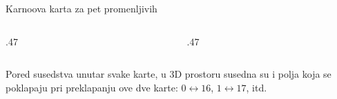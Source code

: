 \begin{frame}[label=02-s037]{Karnoova karta za pet promenljivih}
\setlength{\parskip}{0pt}
\begin{columns}[T,onlytextwidth]
\begin{column}{.47\textwidth}\centering
{}\par\vspace{1mm}

\end{column}
\begin{column}{.47\textwidth}\centering
{}\par\vspace{1mm}

\end{column}
\end{columns}
\par\vspace{1mm}
Pored susedstva unutar svake karte, u 3D prostoru susedna su i polja koja se poklapaju pri preklapanju ove dve karte: \(0\leftrightarrow16\), \(1\leftrightarrow17\), itd.
\end{frame}
